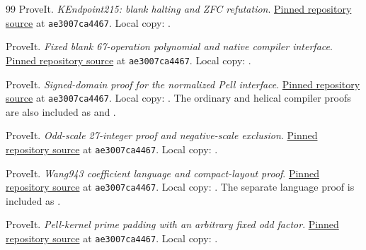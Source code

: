 \begin{thebibliography}{99}
ProveIt. \emph{KEndpoint215: blank halting and ZFC refutation}.
\href{https://github.com/VladimirReshetnikov/ProveIt/blob/ae3007ca4467011e0e051c84acb4a1dd13971b0e/Computability/BusyBeaver/Lean/BusyBeaver/ZFC/KEndpoint215.lean}{Pinned repository source} at \texttt{ae3007ca4467}. Local copy: .

ProveIt. \emph{Fixed blank 67-operation polynomial and native compiler interface}.
\href{https://github.com/VladimirReshetnikov/ProveIt/blob/ae3007ca4467011e0e051c84acb4a1dd13971b0e/SetTheory/Cardinals/docs/reports/hilbert-tenth-problem/con-zfc-diophantine-forms/21-norm12/upstream/FIXED_BLANK_67_PROOF.md}{Pinned repository source} at \texttt{ae3007ca4467}. Local copy: .

ProveIt. \emph{Signed-domain proof for the normalized Pell interface}.
\href{https://github.com/VladimirReshetnikov/ProveIt/blob/ae3007ca4467011e0e051c84acb4a1dd13971b0e/SetTheory/Cardinals/docs/reports/hilbert-tenth-problem/con-zfc-diophantine-forms/21-norm12/upstream/SIGNED_DOMAIN_29.md}{Pinned repository source} at \texttt{ae3007ca4467}. Local copy: . The ordinary and helical compiler proofs are also included as  and .

ProveIt. \emph{Odd-scale 27-integer proof and negative-scale exclusion}.
\href{https://github.com/VladimirReshetnikov/ProveIt/blob/ae3007ca4467011e0e051c84acb4a1dd13971b0e/SetTheory/Cardinals/docs/reports/hilbert-tenth-problem/con-zfc-diophantine-forms/23-separating12/proofs/ODD_SCALE_27_PROOF.md}{Pinned repository source} at \texttt{ae3007ca4467}. Local copy: .

ProveIt. \emph{Wang943 coefficient language and compact-layout proof}.
\href{https://github.com/VladimirReshetnikov/ProveIt/blob/ae3007ca4467011e0e051c84acb4a1dd13971b0e/SetTheory/Cardinals/docs/reports/hilbert-tenth-problem/con-zfc-diophantine-forms/19-wang943/compiler/WANG943_COMPACT_LAYOUT.md}{Pinned repository source} at \texttt{ae3007ca4467}. Local copy: . The separate language proof is included as .

ProveIt. \emph{Pell-kernel prime padding with an arbitrary fixed odd factor}.
\href{https://github.com/VladimirReshetnikov/ProveIt/blob/ae3007ca4467011e0e051c84acb4a1dd13971b0e/Computability/HilbertTenthProblem/Papers/research-wip/native-stream-queue/pell_kernel_prime_padding.md}{Pinned repository source} at \texttt{ae3007ca4467}. Local copy: .


\end{thebibliography}
